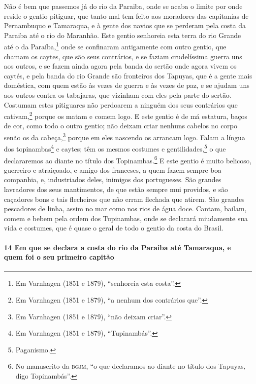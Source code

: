 Não é bem que passemos já do rio da Paraiba, onde se acaba o limite por onde reside o
gentio pitiguar, que tanto mal tem feito aos moradores das capitanias de Pernambuquo e
Tamaraqua, e à gente dos navios que se perderam pela costa da Paraiba até o rio do
Maranhão. Este gentio senhoreia esta terra do rio Grande até o da Paraíba,\footnote{ Em
Varnhagen (1851 e 1879), ``senhoreia esta costa''.} onde se confinaram antigamente com
outro gentio, que chamam os caytes, que são seus contrários, e se faziam crudelíssima
guerra uns aos outros, e se fazem ainda agora pela banda do sertão onde agora vivem os
caytés, e pela banda do rio Grande são fronteiros dos Tapuyas, que é a gente mais
doméstica, com quem estão às vezes de guerra e às vezes de paz, e se ajudam uns aos outros
contra os tabajaras, que vizinham com eles pela parte do sertão. Costumam estes pitiguares
não perdoarem a ninguém dos seus contrários que cativam,\footnote{ Em Varnhagen (1851 e
1879), ``a nenhum dos contrários que''.} porque os matam e comem logo. E este gentio é de
má estatura, baços de cor, como todo o outro gentio; não deixam criar nenhuns cabelos no
corpo senão os da cabeça,\footnote{ Em Varnhagen (1851 e 1879), ``não deixam criar''.}
porque em eles nascendo os arrancam logo. Falam a língua dos topinambas\footnote{ Em
Varnhagen (1851 e 1879), ``Tupinambás''.} e caytes; têm os mesmos costumes e
gentilidades,\footnote{ Paganismo.} o que declararemos ao diante no título dos
Topinambas.\footnote{ No manuscrito da \textsc{bgjm}, ``o que declaramos ao diante no
título dos Tapuyas, digo Topinambás''.} E este gentio é muito belicoso, guerreiro e
atraiçoado, e amigo dos franceses, a quem fazem sempre boa companhia, e, industriados
deles, inimigos dos portugueses. São grandes lavradores dos seus mantimentos, de que estão
sempre mui providos, e são caçadores bons e tais flecheiros que não erram flechada que
atirem. São grandes pescadores de linha, assim no mar como nos rios de água doce. Cantam,
bailam, comem e bebem pela ordem dos Tupinambas, onde se declarará miudamente sua vida e
costumes, que é quase o geral de todo o gentio da costa do Brasil.

\paragraph{14 Em que se declara a costa do rio da Paraiba até Tamaraqua, e quem foi o seu
primeiro capitão}


